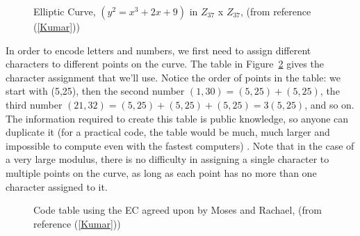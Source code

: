 \begin{figure}[htbp]
	  \caption{\label{fig:DH:DHKE_11} Elliptic Curve, $(y^2 = x^3 + 2x + 9)$ in $Z_{37}$ x $Z_{37}$, (from reference (\ref{Kumar}))}
\end{figure}

In order to encode letters and numbers, we first need to assign different characters to different points on the curve. The table in Figure~\ref{fig:DH:DHKE_17} gives the character assignment that we'll use. Notice the order of points in the table: we start with (5,25), then the second number $(1,30) =(5,25)+(5,25)$, the third number $(21,32)=(5,25)+(5,25)+(5,25)=3(5,25)$, and so on. The information required to create this table is public knowledge, so anyone can duplicate it (for a practical code, the table would be much, much larger and impossible to compute even with the fastest computers) . Note that in the case of a very large modulus, there is no difficulty in assigning a single character to multiple points on the curve, as long as each point has no more than one character assigned to it.

\begin{figure}[htbp]
	  \caption{\label{fig:DH:DHKE_17} Code table using the EC agreed upon by Moses and Rachael, (from reference (\ref{Kumar}))}
\end{figure}


